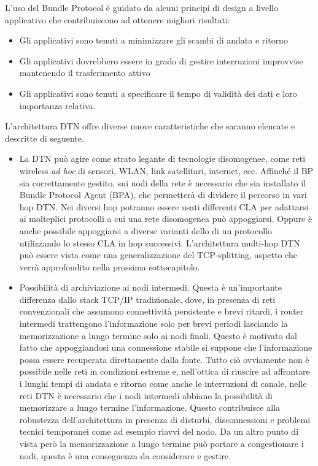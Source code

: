 \documentclass[12pt,a4paper,oneside]{book}
\begin{document}
		L'uso del Bundle Protocol è guidato da alcuni principi di design a livello applicativo che contribuiscono ad ottenere migliori risultati:
		\begin{itemize}
			\item Gli applicativi sono tenuti a minimizzare gli scambi di andata e ritorno
			\item Gli applicativi dovrebbero essere in grado di gestire interruzioni improvvise mantenendo il trasferimento attivo
			\item Gli applicativi sono tenuti a specificare il tempo di validità dei dati e loro importanza relativa.
		\end{itemize}
		
		
		L'architettura DTN offre diverse nuove caratteristiche che saranno elencate e descritte di seguente.
		\begin{itemize}
			\item La DTN può agire come strato legante di tecnologie disomogenee, come reti wireless {\it ad hoc} di sensori, WLAN, link satellitari, internet, ecc. Affinché il BP sia correttamente gestito, sui nodi della rete è necessario che sia installato il Bundle Protocol Agent (BPA), che permetterà di dividere il percorso in vari hop DTN. Nei diversi hop potranno essere usati differenti CLA per adattarsi ai molteplici protocolli a cui una rete disomogenea può appoggiarsi. Oppure è anche possibile appoggiarsi a diverse varianti dello di un protocollo utilizzando lo stesso CLA in hop successivi. L'architettura multi-hop DTN può essere vista come una generalizzazione del TCP-splitting, aspetto che verrà approfondito nella prossima sottocapitolo.
			
			\item Possibilità di archiviazione ai nodi intermedi. Questa è un'importante differenza dallo stack TCP/IP tradizionale, dove, in presenza di reti convenzionali che assumono connettività persistente e brevi ritardi, i router intermedi trattengono l'informazione solo per brevi periodi lasciando la memorizzazione a lungo termine solo ai nodi finali. Questo è motivato dal fatto che appoggiandosi una connessione stabile si suppone che l'informazione possa essere recuperata direttamente dalla fonte. Tutto ciò ovviamente non è possibile nelle reti in condizioni estreme e, nell'ottica di riuscire ad affrontare i lunghi tempi di andata e ritorno come anche le interruzioni di canale, nelle reti DTN è necessario che i nodi intermedi abbiano la possibilità di memorizzare a lungo termine l'informazione. Questo contribuisce alla robustezza dell'architettura in presenza di disturbi, disconnessioni e problemi tecnici temporanei come ad esempio riavvi del nodo. Da un altro punto di vista però la memorizzazione a lungo termine può portare a congestionare i nodi, questa è una conseguenza da considerare e gestire.
			

\end{itemize}
\end{document}
